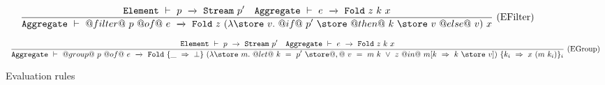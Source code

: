 \begin{figure*}
$$
\ruleIN
{
  \SourceStepXE{p}{\VStream{p'}}
  \quad
  \SourceStepXA{e}{\VFold{z}{k}{x}}
}
{
  \SourceStepXA
    {@filter@~p~@of@~e}
    {\VFold
      {z}
      {(\lam{\store~v}
         @if@~p'~\store~@then@~k~\store~v~@else@~v)}
      {x}}
}{EFilter}
$$

$$
\ruleIN
{
  \SourceStepXE{p}{\VStream{p'}}
  \quad
  \SourceStepXA{e}{\VFold{z}{k}{x}}
}
{
  \SourceStepXA
    {@group@~p~@of@~e}
    {\VFold
      {\{\_~\Rightarrow~\bot\}}
      {(\lam{\store~m}
        @let@~k~=~p'~\store@,@~
              v~=~m~k~\vee~z
        ~@in@~
          m[k~\Rightarrow~k~\store~v])}
      {\{k_i~\Rightarrow~x~(m~k_i)\}_i}}
}{EGroup}
$$


\caption{Evaluation rules}
\label{fig:source:eval}
\end{figure*}


